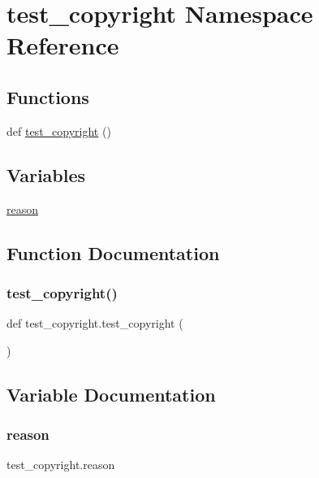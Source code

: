 \hypertarget{namespacetest__copyright}{}\section{test\+\_\+copyright Namespace Reference}
\label{namespacetest__copyright}
\subsection*{Functions}
\begin{DoxyCompactItemize}
\item 
def \mbox{\hyperlink{namespacetest__copyright_a1e85a46f013c8478a2deddb97f25bdf6}{test\+\_\+copyright}} ()
\end{DoxyCompactItemize}
\subsection*{Variables}
\begin{DoxyCompactItemize}
\item 
\mbox{\hyperlink{namespacetest__copyright_a51ed9479571d717f9e5fbeba50329ab2}{reason}}
\end{DoxyCompactItemize}


\subsection{Function Documentation}
\mbox{\label{namespacetest__copyright_a1e85a46f013c8478a2deddb97f25bdf6}} 
\subsubsection{\texorpdfstring{test\+\_\+copyright()}{test\_copyright()}}
{\footnotesize\ttfamily def test\+\_\+copyright.\+test\+\_\+copyright (\begin{DoxyParamCaption}{ }\end{DoxyParamCaption})}



\subsection{Variable Documentation}
\mbox{\label{namespacetest__copyright_a51ed9479571d717f9e5fbeba50329ab2}} 
\subsubsection{\texorpdfstring{reason}{reason}}
{\footnotesize\ttfamily test\+\_\+copyright.\+reason}

